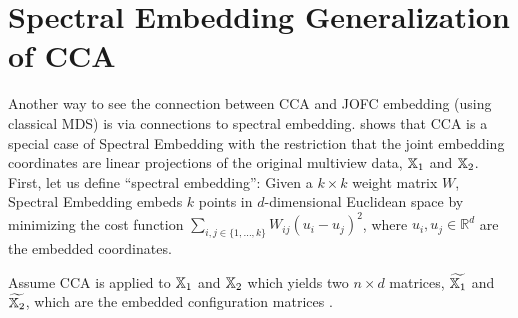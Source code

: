 \documentclass[12pt,oneside,final]{thesis}
\begin{document}
\section{Spectral Embedding Generalization of CCA}

Another way to see the connection between CCA and JOFC embedding (using classical MDS) is via connections to spectral embedding. \cite{CCAviaSpectralEmbed} shows that CCA is a special case of Spectral Embedding with the restriction that the joint embedding coordinates are linear projections of the original multiview data, $\mathbb{X}_1$ and $\mathbb{X}_2$. First, let us define ``spectral embedding'':
Given  a $k \times k$ weight matrix $W$, Spectral Embedding embeds $k$ points in $d$-dimensional Euclidean space by  minimizing the cost function $\sum_{i,j \in \{1,\ldots,k\}}W_{ij}\left(u_i-u_j\right)^2$, where $u_i, u_j \in \mathbb{R}^d$ are the embedded coordinates.

Assume CCA is applied to $\mathbb{X}_1$ and $\mathbb{X}_2$ which yields two  $n \times d$ matrices, $\widetilde{\mathbb{X}_1}$ and $\widetilde{\mathbb{X}_2}$,  which are the embedded configuration matrices . 
\end{document}
